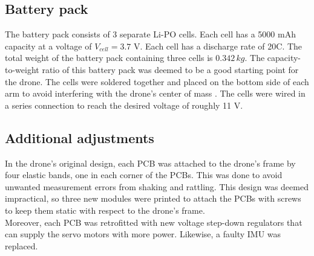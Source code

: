 \subsection{Battery pack}
The battery pack consists of 3 separate Li-PO cells. Each cell has a 5000 mAh capacity at a voltage of $V_{cell} = 3.7$ V. Each cell has a discharge rate of 20C. The total weight of the battery pack containing three cells is $0.342 \,kg$. The capacity-to-weight ratio of this battery pack was deemed to be a good starting point for the drone. The cells were soldered together and placed on the bottom side of each arm to avoid interfering with the drone's center of mass \cite{battery}. The cells were wired in a series connection to reach the desired voltage of roughly 11 V.

\subsection{Additional adjustments}
In the drone's original design, each PCB was attached to the drone's frame by four elastic bands, one in each corner of the PCBs. This was done to avoid unwanted measurement errors from shaking and rattling. This design was deemed impractical, so three new modules were printed to attach the PCBs with screws to keep them static with respect to the drone's frame.\\
Moreover, each PCB was retrofitted with new voltage step-down regulators that can supply the servo motors with more power. Likewise, a faulty IMU was replaced.

